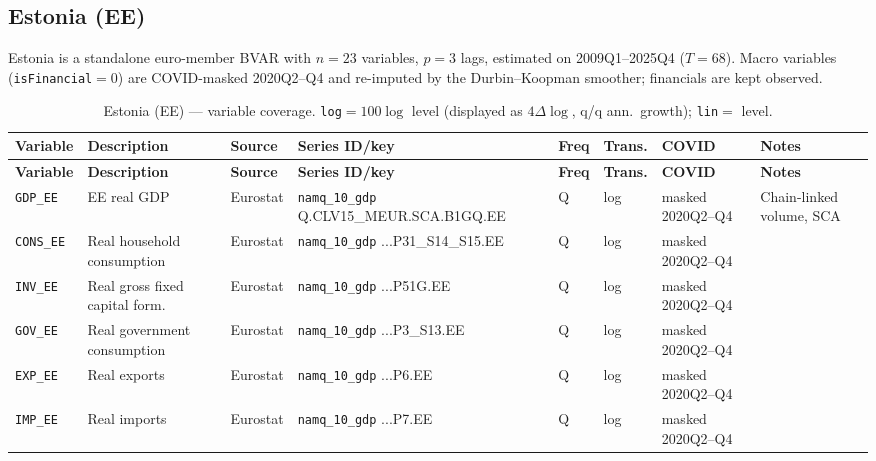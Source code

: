 \subsection{Estonia (EE)}\label{sec:data:EE}
Estonia is a standalone euro-member BVAR with $n=23$ variables,
$p=3$ lags, estimated on 2009Q1--2025Q4 ($T=68$).  Macro variables
(\texttt{isFinancial}$=0$) are COVID-masked 2020Q2--Q4 and re-imputed by
the Durbin--Koopman smoother; financials are kept observed.

{\footnotesize
\begin{longtable}{@{}p{1.9cm}p{2.9cm}p{1.5cm}p{2.7cm}p{0.7cm}p{1.0cm}p{1.6cm}p{2.4cm}@{}}
\caption{Estonia (EE) --- variable coverage.  \texttt{log}$=100\log$ level
(displayed as $4\Delta\log$, q/q ann.\ growth); \texttt{lin}$=$ level.}
\label{tab:data:EE}\\
\toprule
\textbf{Variable} & \textbf{Description} & \textbf{Source} & \textbf{Series ID/key} & \textbf{Freq} & \textbf{Trans.} & \textbf{COVID} & \textbf{Notes} \\
\midrule \endfirsthead
\toprule
\textbf{Variable} & \textbf{Description} & \textbf{Source} & \textbf{Series ID/key} & \textbf{Freq} & \textbf{Trans.} & \textbf{COVID} & \textbf{Notes} \\
\midrule \endhead
\bottomrule \endfoot
\texttt{GDP\_EE}      & EE real GDP                       & Eurostat & \texttt{namq\_10\_gdp} Q.\allowbreak CLV15\_MEUR.\allowbreak SCA.\allowbreak B1GQ.\allowbreak EE       & Q & log & masked 2020Q2--Q4 & Chain-linked volume, SCA \\
\texttt{CONS\_EE}     & Real household consumption        & Eurostat & \texttt{namq\_10\_gdp} ...P31\_S14\_S15.EE             & Q & log & masked 2020Q2--Q4 & \\
\texttt{INV\_EE}      & Real gross fixed capital form.    & Eurostat & \texttt{namq\_10\_gdp} ...P51G.EE                      & Q & log & masked 2020Q2--Q4 & \\
\texttt{GOV\_EE}      & Real government consumption       & Eurostat & \texttt{namq\_10\_gdp} ...P3\_S13.EE                   & Q & log & masked 2020Q2--Q4 & \\
\texttt{EXP\_EE}      & Real exports                      & Eurostat & \texttt{namq\_10\_gdp} ...P6.EE                        & Q & log & masked 2020Q2--Q4 & \\
\texttt{IMP\_EE}      & Real imports                      & Eurostat & \texttt{namq\_10\_gdp} ...P7.EE                        & Q & log & masked 2020Q2--Q4 & \\

\end{longtable}}
